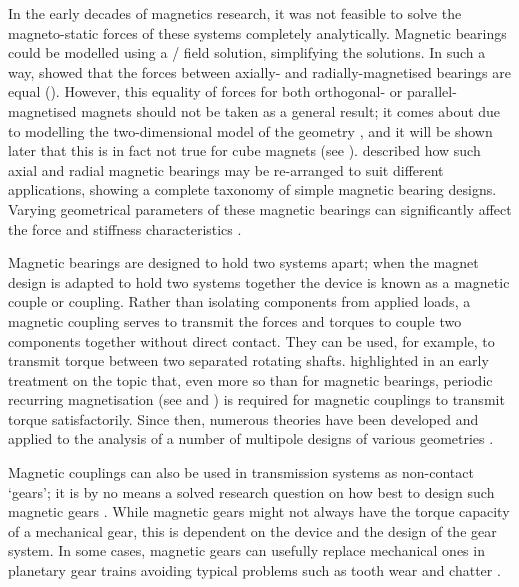 \documentclass[11pt,a4paper]{memoir}
\begin{document}
In the early decades of magnetics research, it was not feasible to solve the magneto-static forces of these systems completely analytically.
Magnetic bearings could be modelled using a \twoD/ field solution, simplifying the solutions.
In such a way, \textcite{yonnet1978} showed that the forces between axially- and radially-magnetised bearings are equal ().
However, this equality of forces for both orthogonal- or parallel-magnetised magnets should not be taken as a general result; it comes about due to modelling the two-dimensional model of the geometry \cite{anderson1987-ietm}, and it will be shown later that this is in fact not true for cube magnets (see ).
\textcite{yonnet1981} described how such axial and radial magnetic bearings may be re-arranged to suit different applications, showing a complete taxonomy of simple magnetic bearing designs.
Varying geometrical parameters of these magnetic bearings can significantly affect the force and stiffness characteristics \cite{bassani2006-trib-int}.


Magnetic bearings are designed to hold two systems apart; when the magnet design is adapted to hold two systems together the device is known as a magnetic couple or coupling.
Rather than isolating components from applied loads, a magnetic coupling serves to transmit the forces and torques to couple two components together without direct contact.
They can be used, for example, to transmit torque between two separated rotating shafts.
\textcite{yonnet1981} highlighted in an early treatment on the topic that, even more so than for magnetic bearings, periodic recurring magnetisation (see  and ) is required for magnetic couplings to transmit torque satisfactorily.
Since then, numerous theories have been developed and applied to the analysis of a number of multipole designs of various geometries \cite{charpentier1999-ietm-mar,charpentier1999-ietm-sep,charpentier2001-compel,chen2003,ravaud2009-coupling-3d,ravaud2010-ietm-coupling}.

Magnetic couplings can also be used in transmission systems as non-contact `gears'; it is by no means a solved research question on how best to design such magnetic gears
\cite{rens2010-ietia}.
While magnetic gears might not always have the torque capacity of a mechanical gear, this is dependent on the device and the design of the gear system.
In some cases, magnetic gears can usefully replace mechanical ones in planetary gear trains avoiding typical problems such as tooth wear and chatter
\cite{gouda2011-ietm}.
\end{document}
